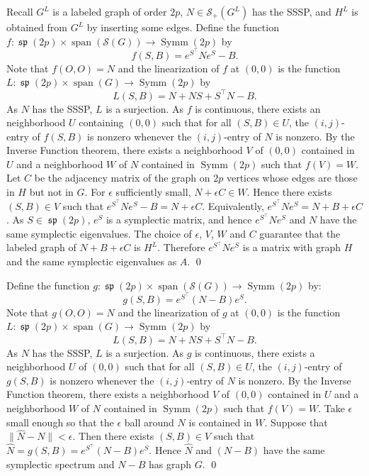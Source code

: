 \documentclass[12pt]{article}
\theoremstyle{definition}
\theoremstyle{definition}
\theoremstyle{definition}
\numberwithin{figure}{section}
\numberwithin{equation}{section}
\newcommand{\Span}{\operatorname{span}}
\newcommand{\symp}{\mathcal{S}_+}
\newcommand{\SG}{\mathcal{S}(G)}
\newcommand{\symm}{\operatorname{Symm}}
\newcommand{\spLA}{\operatorname{\mathfrak{sp}}}
\newcommand{\trans}{^{\top}}
\newcommand{\noi}{\noindent}
\newcommand{\ms}{\medskip}
\begin{document}
\medskip
\noi
Recall  $G^L$ is a labeled graph of order $2p$,  $N\in\symp(G^L)$ has the SSSP, and   
 $H^L$ is  obtained from $G^L$ by inserting some edges.
Define the function $f \colon \spLA (2p) \times  \Span (\SG) \rightarrow \symm(2p)$
by 
\[ f(S, B)= e^{S\trans} N e^S -B.\]
Note that $f(O,O)=N$ and the linearization of $f$ at $(0,0)$
is the function $L \colon \spLA (2p) \times  \Span(G) \rightarrow \symm(2p)$ by 
\[ 
L(S,B)= N + NS + S\trans N -B.
\]
As $N$ has the SSSP, $L$ is a surjection.
As $f$ is continuous, there exists an neighborhood $U$ containing $(0,0)$ 
such that for all $(S,B) \in U$, the  $(i,j)$-entry of $f(S,B)$ is nonzero whenever
the $(i,j)$-entry of $N$ is nonzero.  By the Inverse Function theorem, there exists 
a neighborhood $V$ of $(0,0)$ contained in $U$ and a neighborhood $W$ of $N$ 
contained in $\symm(2p)$ such that $f(V)=W$.  Let $C$ be the adjacency matrix of the 
graph on $2p$ vertices whose edges are those in $H$ but not in $G$.  For $\epsilon$
sufficiently small, $N + \epsilon C \in W$.  Hence there exists $(S,B) \in V$
such that $e^{S\trans}Ne^S-B= N + \epsilon C$.  Equivalently, 
$e^{S \trans} Ne^{S} = N +B +\epsilon C$.  As $S \in \spLA (2p)$, $e^S$ is a symplectic matrix, 
and hence $e^{{S} \trans} N e^{S} $ and $N$ have the same symplectic eigenvalues.  The choice of 
$\epsilon$, $V$, $W$ and $C$ guarantee that the  labeled graph of $N + B + \epsilon C$ is $H^L$.
Therefore $e^{S{\trans}}N e^S$ is a matrix with graph $H$ and the same symplectic eigenvalues as 
$A$. 
\qed

\medskip
\noi {\bf Proof of Theorem \ref{Thm:bifurcation} (Bifurcation Theorem).}

\medskip\noi
Define the function $g\colon \spLA (2p) \times  \Span (\SG) \rightarrow \symm(2p)$
by: 
\[ g(S, B)= e^{S\trans} (N-B) e^S.\]
Note that $g(O,O)=N$ and the linearization of $g$ at $(0,0)$
is the function $L\colon \spLA (2p) \times \Span (G) \rightarrow \symm(2p)$ by 
\[ 
L(S,B)= N + NS + S\trans N -B.
\]
As $N$ has the SSSP, $L$ is a surjection.
As $g$ is continuous, there exists a neighborhood $U$ of $(0,0)$ 
such that for all $(S,B) \in U$, the  $(i,j)$-entry of $g(S,B)$ is nonzero whenever
the $(i,j)$-entry of $N$ is nonzero.  By the Inverse Function theorem, there exists 
a neighborhood $V$ of $(0,0)$ contained in $U$ and a neighborhood $W$ of $N$ 
contained in $\symm(2p)$ such that $f(V)=W$. Take $\epsilon $ small enough so that 
the $\epsilon$ ball around $N$  is contained in $W$. Suppose that $\| \widehat{N} -N \|<\epsilon$.
Then there exists $(S,B) \in V$ such that $\widehat{N}= g(S,B)= e^{S\trans} (N-B) e^{S}$.
Hence $\widehat{N}$ and $(N-B)$ have the same symplectic spectrum and $N-B$ has graph $G$. 
\qed \ms
\end{document}
